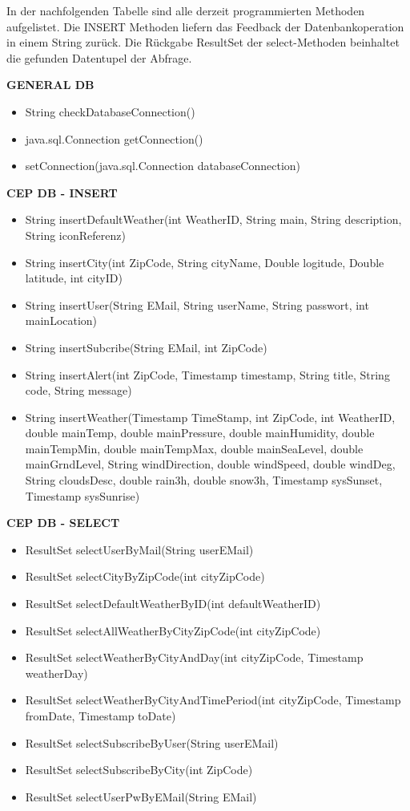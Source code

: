 In der nachfolgenden Tabelle sind alle derzeit programmierten Methoden aufgelistet.
Die INSERT  Methoden liefern das Feedback der Datenbankoperation in einem String zurück. Die Rückgabe ResultSet der select-Methoden beinhaltet die gefunden Datentupel der Abfrage.

{\bf GENERAL DB}
\begin{itemize}
\item String  checkDatabaseConnection()
\item java.sql.Connection getConnection()
\item setConnection(java.sql.Connection  databaseConnection)
\end{itemize}

{\bf CEP DB - INSERT}
\begin{itemize}
\item String insertDefaultWeather(int WeatherID, String main, String description, String iconReferenz)
\item String insertCity(int ZipCode, String cityName, Double logitude, Double latitude, int cityID)
\item String insertUser(String EMail, String userName, String passwort, int mainLocation)
\item String insertSubcribe(String EMail, int ZipCode)
\item String insertAlert(int ZipCode, Timestamp timestamp, String title, String code, String message)
\item String insertWeather(Timestamp TimeStamp, int ZipCode, int WeatherID, 
				double mainTemp, double mainPressure, double mainHumidity, double mainTempMin,
				double mainTempMax, double mainSeaLevel, double mainGrndLevel,
				String windDirection, double windSpeed, double windDeg, String cloudsDesc, double rain3h, 
				double snow3h, 
				Timestamp sysSunset, Timestamp sysSunrise)
\end{itemize}
\newpage
{\bf CEP DB - SELECT }
\begin{itemize}
\item ResultSet selectUserByMail(String userEMail)
\item ResultSet selectCityByZipCode(int cityZipCode)
\item ResultSet selectDefaultWeatherByID(int defaultWeatherID)
\item ResultSet selectAllWeatherByCityZipCode(int cityZipCode)
\item ResultSet selectWeatherByCityAndDay(int cityZipCode, Timestamp weatherDay)
\item ResultSet selectWeatherByCityAndTimePeriod(int cityZipCode, Timestamp fromDate, Timestamp toDate) 
\item ResultSet selectSubscribeByUser(String userEMail)
\item ResultSet selectSubscribeByCity(int ZipCode)
\item ResultSet selectUserPwByEMail(String EMail)
\end{itemize}


